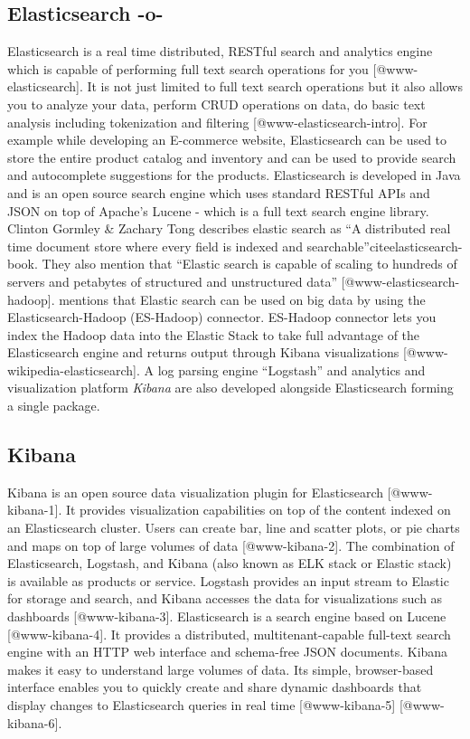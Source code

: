   
\subsection{Elasticsearch -o-}

Elasticsearch is a real time distributed, RESTful search and analytics
engine which is capable of performing full text search operations for
you [@www-elasticsearch].  It is not just limited to full text
search operations but it also allows you to analyze your data, perform
CRUD operations on data, do basic text analysis including tokenization
and filtering [@www-elasticsearch-intro]. For example while
developing an E-commerce website, Elasticsearch can be used to store
the entire product catalog and inventory and can be used to provide
search and autocomplete suggestions for the products. Elasticsearch is
developed in Java and is an open source search engine which uses
standard RESTful APIs and JSON on top of Apache's Lucene - which is a
full text search engine library. Clinton Gormley \& Zachary Tong
describes elastic search as ``A distributed real time document store
where every field is indexed and
searchable''cite{elasticsearch-book}. They also mention that ``Elastic
search is capable of scaling to hundreds of servers and petabytes of
structured and unstructured data''
[@www-elasticsearch-hadoop]. mentions that Elastic search can be
used on big data by using the Elasticsearch-Hadoop (ES-Hadoop)
connector. ES-Hadoop connector lets you index the Hadoop data into the
Elastic Stack to take full advantage of the Elasticsearch engine and
returns output through Kibana visualizations
[@www-wikipedia-elasticsearch]. A log parsing engine
``Logstash'' and analytics and visualization platform \textit{Kibana}
are also developed alongside Elasticsearch forming a single package.


    
\subsection{Kibana}

Kibana is an open source data visualization plugin for
Elasticsearch [@www-kibana-1]. It provides visualization
capabilities on top of the content indexed on an Elasticsearch
cluster. Users can create bar, line and scatter plots, or pie charts
and maps on top of large volumes of data [@www-kibana-2]. The
combination of Elasticsearch, Logstash, and Kibana (also known as ELK
stack or Elastic stack) is available as products or service. Logstash
provides an input stream to Elastic for storage and search, and Kibana
accesses the data for visualizations such as
dashboards [@www-kibana-3].  Elasticsearch is a search engine
based on Lucene [@www-kibana-4]. It provides a distributed,
multitenant-capable full-text search engine with an HTTP web interface
and schema-free JSON documents. Kibana makes it easy to understand
large volumes of data. Its simple, browser-based interface enables you
to quickly create and share dynamic dashboards that display changes to
Elasticsearch queries in real
time [@www-kibana-5] [@www-kibana-6].

